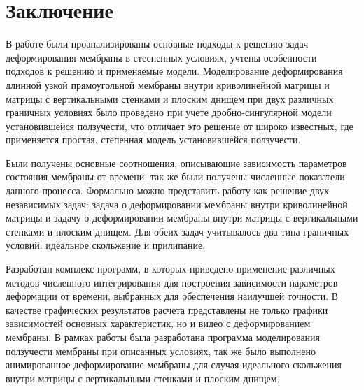 \chapter*{Заключение}
В работе были проанализированы основные подходы к решению задач деформирования мембраны в стесненных условиях, учтены особенности подходов к решению и применяемые модели.  Моделирование деформирования длинной узкой прямоугольной мембраны 
внутри криволинейной матрицы и матрицы с вертикальными стенками и плоским днищем при двух различных граничных условиях было проведено при учете 
дробно-сингулярной модели установившейся ползучести, что отличает это решение от широко известных, где применяется простая, степенная модель установившейся ползучести.

Были получены основные соотношения, описывающие зависимость параметров состояния мембраны от времени, так
же были получены численные показатели данного процесса. Формально можно представить работу как решение двух независимых задач: задача о деформировании мембраны внутри криволинейной матрицы и задачу о деформировании мембраны внутри матрицы с вертикальными стенками и плоским днищем.
Для обеих задач учитывалось два типа граничных условий: идеальное скольжение и прилипание.

Разработан комплекс программ, в которых приведено применение  различных методов численного интегрирования для построения зависимости параметров деформации от времени, выбранных для обеспечения наилучшей точности. В качестве графических результатов расчета представлены не только графики зависимостей основных характеристик, но и видео с деформированием мембраны. В рамках работы была разработана программа моделирования ползучести мембраны при описанных условиях, так же было выполнено анимированное деформирование мембраны для случая идеального скольжения внутри матрицы с вертикальными стенками и плоским днищем.
